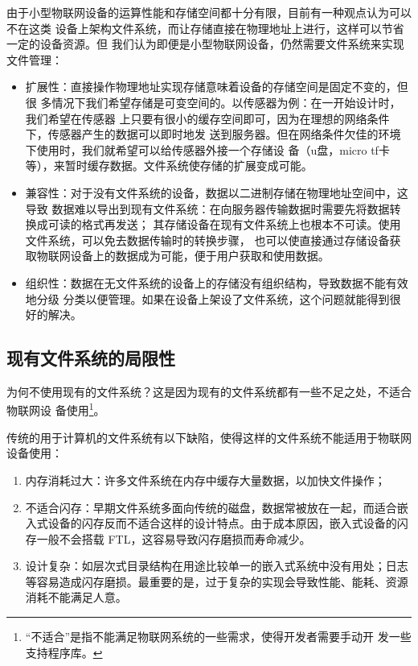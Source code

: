 \documentclass{ctexart}
\begin{document}
由于小型物联网设备的运算性能和存储空间都十分有限，目前有一种观点认为可以不在这类
设备上架构文件系统，而让存储直接在物理地址上进行，这样可以节省一定的设备资源。但
我们认为即便是小型物联网设备，仍然需要文件系统来实现文件管理：
\begin{itemize}
\item 扩展性：直接操作物理地址实现存储意味着设备的存储空间是固定不变的，但很
 多情况下我们希望存储是可变空间的。以传感器为例：在一开始设计时，我们希望在传感器
 上只要有很小的缓存空间即可，因为在理想的网络条件下，传感器产生的数据可以即时地发
 送到服务器。但在网络条件欠佳的环境下使用时，我们就希望可以给传感器外接一个存储设 
 备（u盘，micro tf卡等），来暂时缓存数据。文件系统使存储的扩展变成可能。
\item 兼容性：对于没有文件系统的设备，数据以二进制存储在物理地址空间中，这导致
 数据难以导出到现有文件系统：在向服务器传输数据时需要先将数据转换成可读的格式再发送；
 其存储设备在现有文件系统上也根本不可读。使用文件系统，可以免去数据传输时的转换步骤，
 也可以使直接通过存储设备获取物联网设备上的数据成为可能，便于用户获取和使用数据。
\item 组织性：数据在无文件系统的设备上的存储没有组织结构，导致数据不能有效地分级
 分类以便管理。如果在设备上架设了文件系统，这个问题就能得到很好的解决。
\end{itemize}

\subsection{现有文件系统的局限性}

为何不使用现有的文件系统？这是因为现有的文件系统都有一些不足之处，不适合物联网设
备使用\footnote{“不适合”是指不能满足物联网系统的一些需求，使得开发者需要手动开
  发一些支持程序库。}。

传统的用于计算机的文件系统有以下缺陷，使得这样的文件系统不能适用于物联网设备使用：
\begin{enumerate}
	\item 内存消耗过大：许多文件系统在内存中缓存大量数据，以加快文件操作；
	\item 不适合闪存：早期文件系统多面向传统的磁盘，数据常被放在一起，而适合嵌入式设备的闪存反而不适合这样的设计特点。由于成本原因，嵌入式设备的闪存一般不会搭载 FTL，这容易导致闪存磨损而寿命减少。
	\item 设计复杂：如层次式目录结构在用途比较单一的嵌入式系统中没有用处；日志等容易造成闪存磨损。最重要的是，过于复杂的实现会导致性能、能耗、资源消耗不能满足人意。
\end{enumerate}
\end{document}
